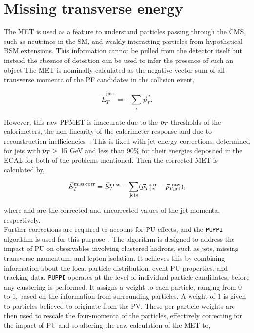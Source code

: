 \section{Missing transverse energy}

The \ac{MET} is used as a feature to understand particles passing through the \ac{CMS}, such as neutrinos in the \ac{SM}, and weakly interacting particles from hypothetical \ac{BSM} extensions.
This information cannot be pulled from the detector itself but instead the absence of detection can be used to infer the presence of such an object
The \ac{MET} is nominally calculated as the negative vector sum of all transverse momenta of the \ac{PF} candidates in the collision event,

\begin{equation}
\vec{E}_{T}^{\text{miss}} = - \sum_{i} \vec{p}_{T}^{\hspace{4pt}i}.
\end{equation}

However, this raw \ac{PF}\ac{MET} is inaccurate due to the $p_{T}$ thresholds of the calorimeters, the non-linearity of the calorimeter response and due to reconstruction inefficiencies~\cite{CMS:2016ljj}.
This is fixed with jet energy corrections, determined for jets with $p_{T}>$ 15 GeV and less than 90\% for their energies deposited in the \ac{ECAL} for both of the problems mentioned. 
Then the corrected \ac{MET} is calculated by,

\begin{equation}
\vec{E}_{T}^{\text{miss,corr}} = \vec{E}_{T}^{\text{miss}} - \sum_{\text{jets}} (\vec{p}_{T,\text{jet}}^{\text{\hspace{4pt}corr}} - \vec{p}_{T,\text{jet}}^{\text{\hspace{4pt}raw}}),
\end{equation}

where  and  are the corrected and uncorrected values of the jet momenta, respectively. \\

Further corrections are required to account for \ac{PU} effects, and the \texttt{PUPPI} algorithm is used for this purpose~\cite{CMS:2020ebo}.
The algorithm is designed to address the impact of \ac{PU} on observables involving clustered hadrons, such as jets, missing transverse momentum, and lepton isolation. 
It achieves this by combining information about the local particle distribution, event \ac{PU} properties, and tracking data. 
\texttt{PUPPI} operates at the level of individual particle candidates, before any clustering is performed. 
It assigns a weight to each particle, ranging from 0 to 1, based on the information from surrounding particles. 
A weight of 1 is given to particles believed to originate from the \ac{PV}. 
These per-particle weights are then used to rescale the four-momenta of the particles, effectively correcting for the impact of \ac{PU} and so altering the raw calculation of the \ac{MET} to,

